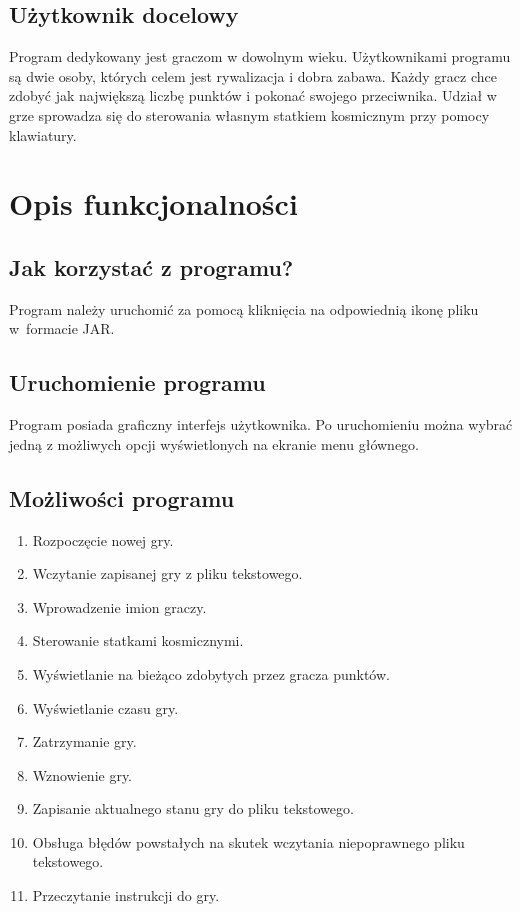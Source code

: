 \documentclass[a4paper]{article}
\begin{document}
\subsection{Użytkownik docelowy}
Program dedykowany jest graczom w dowolnym wieku. Użytkownikami programu są dwie osoby, których celem jest rywalizacja i dobra zabawa. Każdy gracz chce zdobyć jak największą liczbę punktów i pokonać swojego przeciwnika. Udział w grze sprowadza się do sterowania własnym statkiem kosmicznym przy pomocy klawiatury.

\section{Opis funkcjonalności}
\subsection{Jak korzystać z programu?}
Program należy uruchomić za pomocą kliknięcia na odpowiednią ikonę pliku w~formacie JAR.

\subsection{Uruchomienie programu}
Program posiada graficzny interfejs użytkownika. Po uruchomieniu można wybrać jedną z możliwych opcji wyświetlonych na ekranie menu głównego.

\subsection{Możliwości programu}
\begin{enumerate}
    \item Rozpoczęcie nowej gry.
    \item Wczytanie zapisanej gry z pliku tekstowego.
    \item Wprowadzenie imion graczy.
    \item Sterowanie statkami kosmicznymi.
    \item Wyświetlanie na bieżąco zdobytych przez gracza punktów.
    \item Wyświetlanie czasu gry.
    \item Zatrzymanie gry.
    \item Wznowienie gry.
    \item Zapisanie aktualnego stanu gry do pliku tekstowego.
    \item Obsługa błędów powstałych na skutek wczytania niepoprawnego pliku tekstowego.
    \item Przeczytanie instrukcji do gry.
\end{enumerate}
\end{document}
